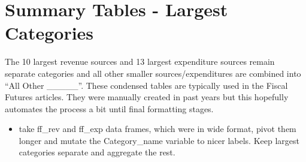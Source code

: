 \documentclass[
  letterpaper,
  DIV=11,
  numbers=noendperiod]{scrreport}
\providecommand{\tightlist}{%
  \setlength{\itemsep}{0pt}\setlength{\parskip}{0pt}}\usepackage{longtable,booktabs,array}
\begin{document}
\hypertarget{summary-tables---largest-categories-1}{%
\section{Summary Tables - Largest
Categories}\label{summary-tables---largest-categories-1}}

The 10 largest revenue sources and 13 largest expenditure sources remain
separate categories and all other smaller sources/expenditures are
combined into ``All Other \_\_\_\_\_''. These condensed tables are
typically used in the Fiscal Futures articles. They were manually
created in past years but this hopefully automates the process a bit
until final formatting stages.

\begin{itemize}
\tightlist
\item
  take ff\_rev and ff\_exp data frames, which were in wide format, pivot
  them longer and mutate the Category\_name variable to nicer labels.
  Keep largest categories separate and aggregate the rest.
\end{itemize}
\end{document}
